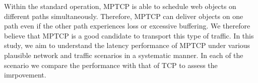 Within the standard operation, MPTCP is able to schedule web objects on different paths simultaneously. 
Therefore, MPTCP can deliver objects on one path even if the other path
experiences loss or excessive buffering. We therefore believe that MPTCP is a good candidate 
to transport this type of traffic. In this study, we aim to understand the latency performance of MPTCP
under various plausible network and traffic scenarios in a systematic manner. In each of the scenario 
we compare the performance with that of TCP to assess the imrpovement.


